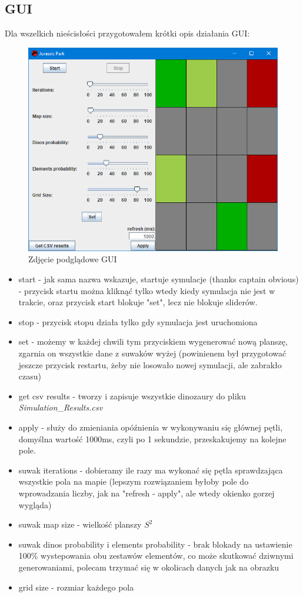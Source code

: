 \subsection{GUI}
Dla wszelkich nieścisłości przygotowałem krótki opis działania GUI:
\begin{figure}[h]
    \centering
    \includegraphics[scale=0.80]{images/gui.png}
    \caption{Zdjęcie podglądowe GUI}
    \label{fig:GUI}
\end{figure}

\begin{itemize}
    \item start - jak sama nazwa wskazuje, startuje symulacje (thanks captain obvious) - przycisk startu można kliknąć tylko wtedy kiedy symulacja nie jest w trakcie, oraz przycisk start blokuje "set", lecz nie blokuje sliderów.
    \item stop - przycisk stopu działa tylko gdy symulacja jest uruchomiona
    \item set - możemy w każdej chwili tym przyciskiem wygenerować nową planszę, zgarnia on wszystkie dane z suwaków wyżej (powinienem był przygotować jeszcze przycisk restartu, żeby nie losowało nowej symulacji, ale zabrakło czasu)
    \item get csv results - tworzy i zapisuje wszystkie dinozaury do pliku \textit{Simulation\_Results.csv}
    \item apply - służy do zmieniania opóźnienia w wykonywaniu się głównej pętli, domyślna wartość 1000ms, czyli po 1 sekundzie, przeskakujemy na kolejne pole.
    \item suwak iterations - dobieramy ile razy ma wykonać się pętla sprawdzająca wszystkie pola na mapie (lepszym rozwiązaniem byłoby pole do wprowadzania liczby, jak na "refresh - apply", ale wtedy okienko gorzej wygląda)
    \item suwak map size - wielkość planszy $S^2$
    \item suwak dinos probability i elements probability - brak blokady na ustawienie 100\% wystepowania obu zestawów elementów, co może skutkować dziwnymi generowaniami, polecam trzymać się w okolicach danych jak na obrazku
    \item grid size - rozmiar każdego pola
\end{itemize}
